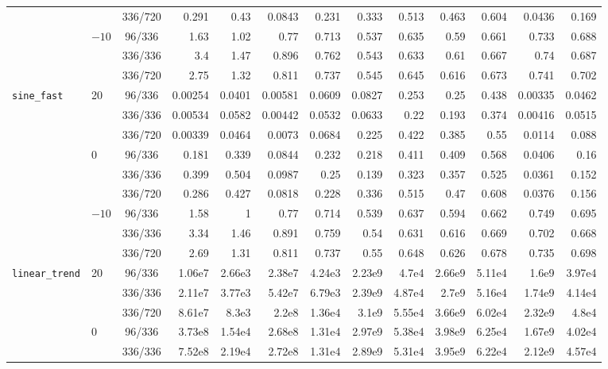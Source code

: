 \documentclass[12pt]{article}
\theoremstyle{definition}
\begin{document}
{\begin{enumerate}[label=\textbf{1.2.\arabic*}, leftmargin=*]
{\begin{longtable}{@{}llc@{\hspace{6pt}}rr@{\hspace{8pt}}rr@{\hspace{8pt}}rr@{\hspace{8pt}}rr@{\hspace{8pt}}rr@{}}
 &  & 336/720 & 0.291 & 0.43 & 0.0843 & 0.231 & 0.333 & 0.513 & 0.463 & 0.604 & 0.0436 & 0.169 \\
\addlinespace[2pt]
 & $-10$ & 96/336 & 1.63 & 1.02 & 0.77 & 0.713 & 0.537 & 0.635 & 0.59 & 0.661 & 0.733 & 0.688 \\
 &  & 336/336 & 3.4 & 1.47 & 0.896 & 0.762 & 0.543 & 0.633 & 0.61 & 0.667 & 0.74 & 0.687 \\
 &  & 336/720 & 2.75 & 1.32 & 0.811 & 0.737 & 0.545 & 0.645 & 0.616 & 0.673 & 0.741 & 0.702 \\
\midrule
\texttt{sine\_fast} & 20 & 96/336 & 0.00254 & 0.0401 & 0.00581 & 0.0609 & 0.0827 & 0.253 & 0.25 & 0.438 & 0.00335 & 0.0462 \\
 &  & 336/336 & 0.00534 & 0.0582 & 0.00442 & 0.0532 & 0.0633 & 0.22 & 0.193 & 0.374 & 0.00416 & 0.0515 \\
 &  & 336/720 & 0.00339 & 0.0464 & 0.0073 & 0.0684 & 0.225 & 0.422 & 0.385 & 0.55 & 0.0114 & 0.088 \\
\addlinespace[2pt]
 & 0 & 96/336 & 0.181 & 0.339 & 0.0844 & 0.232 & 0.218 & 0.411 & 0.409 & 0.568 & 0.0406 & 0.16 \\
 &  & 336/336 & 0.399 & 0.504 & 0.0987 & 0.25 & 0.139 & 0.323 & 0.357 & 0.525 & 0.0361 & 0.152 \\
 &  & 336/720 & 0.286 & 0.427 & 0.0818 & 0.228 & 0.336 & 0.515 & 0.47 & 0.608 & 0.0376 & 0.156 \\
\addlinespace[2pt]
 & $-10$ & 96/336 & 1.58 & 1 & 0.77 & 0.714 & 0.539 & 0.637 & 0.594 & 0.662 & 0.749 & 0.695 \\
 &  & 336/336 & 3.34 & 1.46 & 0.891 & 0.759 & 0.54 & 0.631 & 0.616 & 0.669 & 0.702 & 0.668 \\
 &  & 336/720 & 2.69 & 1.31 & 0.811 & 0.737 & 0.55 & 0.648 & 0.626 & 0.678 & 0.735 & 0.698 \\
\midrule
\texttt{linear\_trend} & 20 & 96/336 & 1.06e7 & 2.66e3 & 2.38e7 & 4.24e3 & 2.23e9 & 4.7e4 & 2.66e9 & 5.11e4 & 1.6e9 & 3.97e4 \\
 &  & 336/336 & 2.11e7 & 3.77e3 & 5.42e7 & 6.79e3 & 2.39e9 & 4.87e4 & 2.7e9 & 5.16e4 & 1.74e9 & 4.14e4 \\
 &  & 336/720 & 8.61e7 & 8.3e3 & 2.2e8 & 1.36e4 & 3.1e9 & 5.55e4 & 3.66e9 & 6.02e4 & 2.32e9 & 4.8e4 \\
\addlinespace[2pt]
 & 0 & 96/336 & 3.73e8 & 1.54e4 & 2.68e8 & 1.31e4 & 2.97e9 & 5.38e4 & 3.98e9 & 6.25e4 & 1.67e9 & 4.02e4 \\
 &  & 336/336 & 7.52e8 & 2.19e4 & 2.72e8 & 1.31e4 & 2.89e9 & 5.31e4 & 3.95e9 & 6.22e4 & 2.12e9 & 4.57e4 \\

\end{longtable}}
\end{enumerate}}
\end{document}
